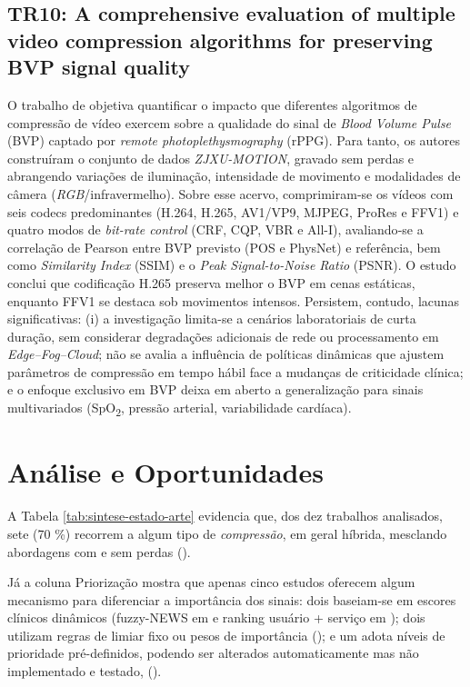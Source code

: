 \documentclass[twoside,english,brazilian]{UNISINOSmonografia}
\begin{document}
\subsection{TR10: A comprehensive evaluation of multiple video compression algorithms for preserving BVP signal quality \cite{Zhou2025}}
O trabalho de \cite{Zhou2025} objetiva quantificar o impacto que diferentes algoritmos de compressão de vídeo exercem sobre a qualidade do sinal de \textit{Blood Volume Pulse} (BVP) captado por \textit{remote photoplethysmography} (rPPG). Para tanto, os autores construíram o conjunto de dados \textit{ZJXU-MOTION}, gravado sem perdas e abrangendo variações de iluminação, intensidade de movimento e modalidades de câmera (\textit{RGB}/infravermelho). Sobre esse acervo, comprimiram‐se os vídeos com seis codecs predominantes (H.264, H.265, AV1/VP9, MJPEG, ProRes e FFV1) e quatro modos de \textit{bit-rate control} (CRF, CQP, VBR e All-I), avaliando‐se a correlação de Pearson entre BVP previsto (POS e PhysNet) e referência, bem como \textit{Similarity Index} (SSIM) e o \textit{Peak Signal-to-Noise Ratio} (PSNR). O estudo conclui que codificação H.265 preserva melhor o BVP em cenas estáticas, enquanto FFV1 se destaca sob movimentos intensos. Persistem, contudo, lacunas significativas: (i) a investigação limita-se a cenários laboratoriais de curta duração, sem considerar degradações adicionais de rede ou processamento em \textit{Edge–Fog–Cloud}; não se avalia a influência de políticas dinâmicas que ajustem parâmetros de compressão em tempo hábil face a mudanças de criticidade clínica; e o enfoque exclusivo em BVP deixa em aberto a generalização para sinais multivariados (SpO\textsubscript{2}, pressão arterial, variabilidade cardíaca).

\section{Análise e Oportunidades}

A Tabela \ref{tab:sintese-estado-arte} evidencia que, dos dez trabalhos analisados, sete (70 \%) recorrem a algum tipo de \textit{compressão}, em geral híbrida, mesclando abordagens com e sem perdas (\cite{Zhou2025,Andrade2025,Hassan2024,Vakil2024,Chang2024,TAO2025,ESMAEILI2023}).

Já a coluna Priorização mostra que apenas cinco estudos oferecem algum mecanismo para diferenciar a importância dos sinais: dois baseiam-se em escores clínicos dinâmicos (fuzzy-NEWS em \cite{Shankani2025} e ranking usuário + serviço em \cite{CASSEL2024}); dois utilizam regras de limiar fixo ou pesos de importância (\cite{MOHAPATRA2025,TAO2025}); e um adota níveis de prioridade pré-definidos, podendo ser alterados automaticamente mas não implementado e testado, (\cite{Andrade2025}).
\end{document}
